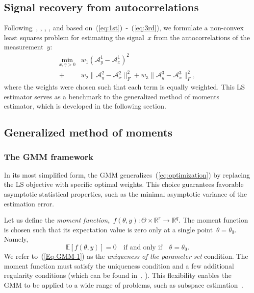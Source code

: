 \documentclass{article}
\newcommand{\A}[0]{\mathcal{A}}
\newcommand{\E}[0]{\mathbb{E}}
\newcommand{\R}[0]{\mathbb{R}}
\begin{document}
\subsection{Signal recovery from autocorrelations}
Following~\cite{bendory2019multi}, \cite{lan2020multi}, \cite{marshall2020image}, \cite{bendory2021multi}, \cite{kreymer2021two} and based on~\mbox{(\ref{eq:1st}) -~(\ref{eq:3rd})}, we formulate a non-convex least squares problem for estimating the signal~$x$ from the autocorrelations of the measurement~$y$:
\begin{align}
\label{eq:optimization}
\min_{x, \gamma > 0} &w_1 (\A_y^1 - \A_x^1)^2 \nonumber\\ +& w_2 \|\A_y^2 - \A_x^2\|_F^2 + w_3 \|\A_y^3 - \A_x^3\|_F^2,
\end{align}
where the weights were chosen such that each term is equally weighted. This LS estimator serves as a benchmark to the generalized method of moments estimator, which is developed in the following section.

\subsection{Generalized method of moments}
\label{gmm}
\subsubsection{The GMM framework}\label{gmm:framwork}
In its most simplified form, the GMM generalizes~(\ref{eq:optimization}) by replacing the LS objective with specific optimal weights. This choice guarantees favorable asymptotic statistical properties, such as {the} minimal asymptotic variance of the estimation error.

Let us define the \textit{moment function},~\mbox{$f(\theta, y)\colon \Theta \times \R^r \to \R^q$}. The moment function is chosen such that its expectation value is zero only at a single point~$\theta=\theta_0$. Namely,
\begin{equation}\label{Eq-GMM-1}
	\E\left[f(\theta,y)\right] = 0 \quad \text{if and only if} \quad \theta = \theta_0.
\end{equation}
We refer to~(\ref{Eq-GMM-1}) as the \textit{uniqueness of the parameter set} condition. The moment function must satisfy the uniqueness condition and a few additional regularity conditions (which can be found in~\cite{Hansen1982}, \cite{abas2021generalized}). This flexibility enables the GMM to be applied to a wide range of problems, such as subspace estimation~\cite{fan2018optimal}.
\end{document}

